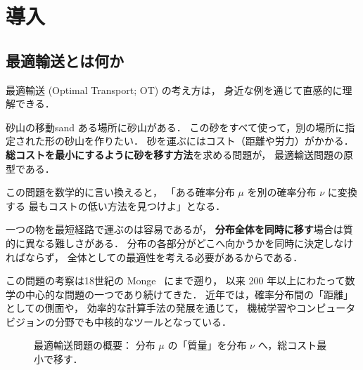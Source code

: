 
\chapter{導入}\label{chap:introduction}

\section{最適輸送とは何か}\label{sec:what-is-ot}

最適輸送 (Optimal Transport; OT) の考え方は，
身近な例を通じて直感的に理解できる．

\begin{example}{砂山の移動}{sand}
ある場所に砂山がある．
この砂をすべて使って，別の場所に指定された形の砂山を作りたい．
砂を運ぶにはコスト（距離や労力）がかかる．
\textbf{総コストを最小にするように砂を移す方法}を求める問題が，
最適輸送問題の原型である．
\end{example}

この問題を数学的に言い換えると，
「ある確率分布 $\mu$ を別の確率分布 $\nu$ に変換する
最もコストの低い方法を見つけよ」となる．

\medskip

一つの物を最短経路で運ぶのは容易であるが，
\textbf{分布全体を同時に移す}場合は質的に異なる難しさがある．
分布の各部分がどこへ向かうかを同時に決定しなければならず，
全体としての最適性を考える必要があるからである．

この問題の考察は18世紀の Monge~\cite{Monge1781} にまで遡り，
以来 200 年以上にわたって数学の中心的な問題の一つであり続けてきた．
近年では，確率分布間の「距離」としての側面や，
効率的な計算手法の発展を通じて，
機械学習やコンピュータビジョンの分野でも中核的なツールとなっている．

\begin{figure}[htbp]
\centering
{}
\caption{最適輸送問題の概要：
分布 $\mu$ の「質量」を分布 $\nu$ へ，総コスト最小で移す．}
\label{fig:ot-overview}
\end{figure}


